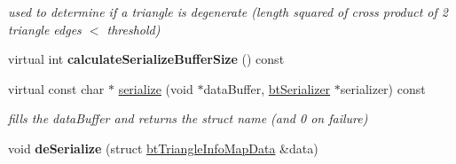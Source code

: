 \begin{DoxyCompactItemize}
\begin{DoxyCompactList}\small\item\em used to determine if a triangle is degenerate (length squared of cross product of 2 triangle edges $<$ threshold) \end{DoxyCompactList}\item 
\mbox{\label{structbtTriangleInfoMap_a415f8a5b000e67ae91d4bb2a96a3ccb4}} 
virtual int {\bfseries calculate\+Serialize\+Buffer\+Size} () const
\item 
\mbox{\label{structbtTriangleInfoMap_af2dd04d94e55a15f2846bd3518df1b35}} 
virtual const char $\ast$ \hyperlink{structbtTriangleInfoMap_af2dd04d94e55a15f2846bd3518df1b35}{serialize} (void $\ast$data\+Buffer, \hyperlink{classbtSerializer}{bt\+Serializer} $\ast$serializer) const
\begin{DoxyCompactList}\small\item\em fills the data\+Buffer and returns the struct name (and 0 on failure) \end{DoxyCompactList}\item 
\mbox{\label{structbtTriangleInfoMap_a2fd5bc80cc57a717512fc3a2bcdb2287}} 
void {\bfseries de\+Serialize} (struct \hyperlink{structbtTriangleInfoMapData}{bt\+Triangle\+Info\+Map\+Data} \&data)
\end{DoxyCompactItemize}
